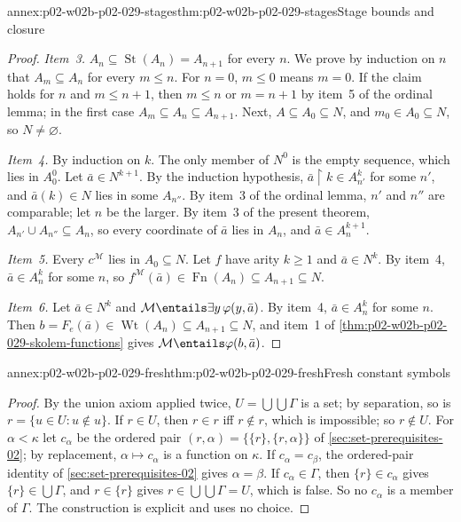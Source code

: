 \begin{annexitem}{annex:p02-w02b-p02-029-stages}{thm:p02-w02b-p02-029-stages}{Stage bounds and closure}
\begin{proof}
\emph{Item~3.} \(A_n\subseteq\operatorname{St}(A_n)=A_{n+1}\) for every
\(n\). We prove by induction on \(n\) that \(A_m\subseteq A_n\) for every
\(m\leq n\). For \(n=0\), \(m\leq0\) means \(m=0\). If the claim holds for
\(n\) and \(m\leq n+1\), then \(m\leq n\) or \(m=n+1\) by item~5 of the
ordinal lemma; in the first case \(A_m\subseteq A_n\subseteq A_{n+1}\). Next,
\(A\subseteq A_0\subseteq N\), and \(m_0\in A_0\subseteq N\), so
\(N\neq\varnothing\).

\emph{Item~4.} By induction on \(k\). The only member of \(N^0\) is the empty
sequence, which lies in \(A_0^0\). Let \(\bar a\in N^{k+1}\). By the
induction hypothesis, \(\bar a\mathbin{\upharpoonright}k\in A_{n'}^k\) for
some \(n'\), and \(\bar a(k)\in N\) lies in some \(A_{n''}\). By item~3 of
the ordinal lemma, \(n'\) and \(n''\) are comparable; let \(n\) be the larger.
By item~3 of the present theorem, \(A_{n'}\cup A_{n''}\subseteq A_n\), so
every coordinate of \(\bar a\) lies in \(A_n\), and \(\bar a\in A_n^{k+1}\).

\emph{Item~5.} Every \(c^{\mathcal M}\) lies in \(A_0\subseteq N\). Let \(f\)
have arity \(k\geq1\) and \(\bar a\in N^k\). By item~4, \(\bar a\in A_n^k\)
for some \(n\), so
\(f^{\mathcal M}(\bar a)\in\operatorname{Fn}(A_n)\subseteq A_{n+1}\subseteq N\).

\emph{Item~6.} Let \(\bar a\in N^k\) and
\(\mathcal M\entails\exists y\,\varphi(y,\bar a)\). By item~4,
\(\bar a\in A_n^k\) for some \(n\). Then
\(b=F_e(\bar a)\in\operatorname{Wt}(A_n)\subseteq A_{n+1}\subseteq N\), and
item~1 of \cref{thm:p02-w02b-p02-029-skolem-functions} gives
\(\mathcal M\entails\varphi(b,\bar a)\).
\end{proof}
\end{annexitem}

\begin{annexitem}{annex:p02-w02b-p02-029-fresh}{thm:p02-w02b-p02-029-fresh}{Fresh constant symbols}
\begin{proof}
By the union axiom applied twice, \(U=\bigcup\bigcup\Gamma\) is a set; by
separation, so is \(r=\{u\in U:u\notin u\}\). If \(r\in U\), then
\(r\in r\) iff \(r\notin r\), which is impossible; so \(r\notin U\). For
\(\alpha<\kappa\) let \(c_\alpha\) be the ordered pair
\((r,\alpha)=\{\{r\},\{r,\alpha\}\}\) of \cref{sec:set-prerequisites-02};
by replacement, \(\alpha\mapsto c_\alpha\) is a function on \(\kappa\). If
\(c_\alpha=c_\beta\), the ordered-pair identity of
\cref{sec:set-prerequisites-02} gives \(\alpha=\beta\). If
\(c_\alpha\in\Gamma\), then \(\{r\}\in c_\alpha\) gives
\(\{r\}\in\bigcup\Gamma\), and \(r\in\{r\}\) gives
\(r\in\bigcup\bigcup\Gamma=U\), which is false. So no \(c_\alpha\) is a
member of \(\Gamma\). The construction is explicit and uses no choice.
\end{proof}
\end{annexitem}

